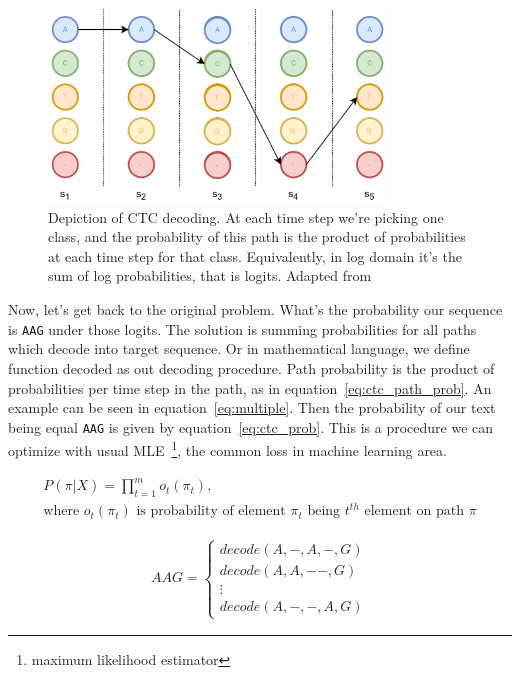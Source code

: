 \documentclass[times, utf8, diplomski, english]{fer}
\begin{document}
\begin{figure}
    \begin{center}
        \includegraphics[width=0.8\textwidth]{ctc_graph_1}
        \caption{Depiction of CTC decoding. At each time step we're picking one class, and the probability of this path is the product of probabilities at each time step for that class. Equivalently, in log domain it's the sum of log probabilities, that is logits. Adapted from~\citep{mratkovic}}
        \label{fg:ctc_graph_0}
    \end{center}
\end{figure}

Now, let's get back to the original problem. What's the probability our sequence is \texttt{AAG} under those logits. 
The solution is summing probabilities for all paths which decode into target sequence. 
Or in mathematical language, we define function decoded as out decoding procedure. 
Path probability is the product of probabilities per time step in the path, as in equation~\ref{eq:ctc_path_prob}.
An example can be seen in equation~\ref{eq:multiple}. 
Then the probability of our text being equal \texttt{AAG} is given by equation~\ref{eq:ctc_prob}.
This is a procedure we can optimize with usual MLE~\footnote{maximum likelihood estimator}, the common loss in machine learning area.

\begin{equation}
\begin{gathered}
\label{eq:ctc_path_prob}
P(\pi | X) = \prod_{t=1}^{m} o_t(\pi_t), \\
\text{where $o_t(\pi_t)$ is probability of element $\pi_t$ being $t^{th}$ element on path $\pi$}
\end{gathered}
\end{equation}

\begin{equation}
\begin{gathered}
\label{eq:multiple}
AAG = \begin{cases}
decode(A, -, A, -, G) \\
decode(A, A, - -, G) \\
\vdots \\
decode(A, -, -, A, G) 
\end{cases}
\end{gathered}
\end{equation}
\end{document}
